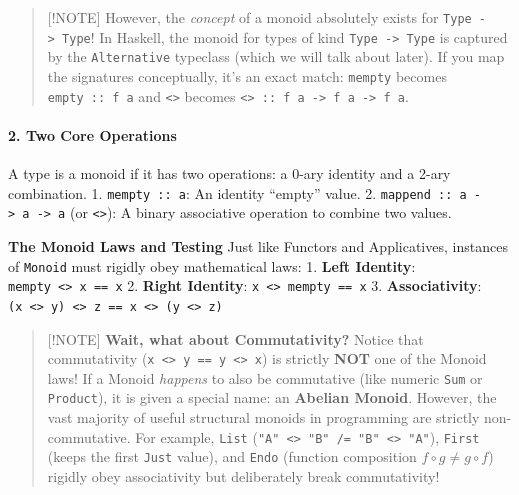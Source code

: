 \documentclass[
]{article}
\begin{document}
\begin{quote}
{[}!NOTE{]} However, the \emph{concept} of a monoid absolutely exists
for \texttt{Type\ -\textgreater{}\ Type}! In Haskell, the monoid for
types of kind \texttt{Type\ -\textgreater{}\ Type} is captured by the
\texttt{Alternative} typeclass (which we will talk about later). If you
map the signatures conceptually, it's an exact match: \texttt{mempty}
becomes \texttt{empty\ ::\ f\ a} and \texttt{\textless{}\textgreater{}}
becomes
\texttt{\textless{}\textbar{}\textgreater{}\ ::\ f\ a\ -\textgreater{}\ f\ a\ -\textgreater{}\ f\ a}.
\end{quote}

\paragraph{2. Two Core Operations}\label{two-core-operations}

A type is a monoid if it has two operations: a 0-ary identity and a
2-ary combination. 1. \texttt{mempty\ ::\ a}: An identity ``empty''
value. 2.
\texttt{mappend\ ::\ a\ -\textgreater{}\ a\ -\textgreater{}\ a} (or
\texttt{\textless{}\textgreater{}}): A binary associative operation to
combine two values.

\textbf{The Monoid Laws and Testing} Just like Functors and
Applicatives, instances of \texttt{Monoid} must rigidly obey
mathematical laws: 1. \textbf{Left Identity}:
\texttt{mempty\ \textless{}\textgreater{}\ x\ ==\ x} 2. \textbf{Right
Identity}: \texttt{x\ \textless{}\textgreater{}\ mempty\ ==\ x} 3.
\textbf{Associativity}:
\texttt{(x\ \textless{}\textgreater{}\ y)\ \textless{}\textgreater{}\ z\ ==\ x\ \textless{}\textgreater{}\ (y\ \textless{}\textgreater{}\ z)}

\begin{quote}
{[}!NOTE{]} \textbf{Wait, what about Commutativity?} Notice that
commutativity
(\texttt{x\ \textless{}\textgreater{}\ y\ ==\ y\ \textless{}\textgreater{}\ x})
is strictly \textbf{NOT} one of the Monoid laws! If a Monoid
\emph{happens} to also be commutative (like numeric \texttt{Sum} or
\texttt{Product}), it is given a special name: an \textbf{Abelian
Monoid}. However, the vast majority of useful structural monoids in
programming are strictly non-commutative. For example, \texttt{List}
(\texttt{"A"\ \textless{}\textgreater{}\ "B"\ /=\ "B"\ \textless{}\textgreater{}\ "A"}),
\texttt{First} (keeps the first \texttt{Just} value), and \texttt{Endo}
(function composition \(f \circ g \neq g \circ f\)) rigidly obey
associativity but deliberately break commutativity!
\end{quote}
\end{document}
